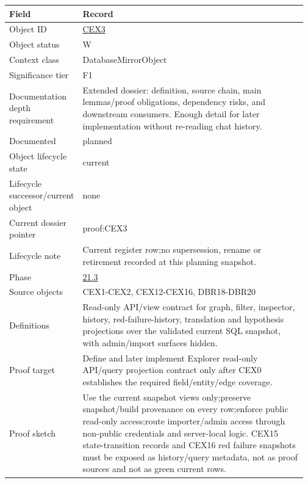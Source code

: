 \begin{longtable}{L{0.16\linewidth} L{0.81\linewidth}}
\hline
\textbf{Field} & \textbf{Record}\\
\hline
Object ID & \hyperlink{object-row-CEX3}{CEX3}\\
\hline\addlinespace[0.20em]
Object status & W\\
\hline\addlinespace[0.20em]
Context class & DatabaseMirrorObject\\
\hline\addlinespace[0.20em]
Significance tier & F1\\
\hline\addlinespace[0.20em]
Documentation depth requirement & Extended dossier: definition, source chain, main lemmas/\allowbreak{}proof obligations, dependency risks, and downstream consumers. Enough detail for later implementation without re-reading chat history.\\
\hline\addlinespace[0.20em]
Documented & planned\\
\hline\addlinespace[0.20em]
Object lifecycle state & current\\
\hline\addlinespace[0.20em]
Lifecycle successor/\allowbreak{}current object & none\\
\hline\addlinespace[0.20em]
Current dossier pointer & proof:CEX3\\
\hline\addlinespace[0.20em]
Lifecycle note & Current register row;\newline no supersession, rename or retirement recorded at this planning snapshot.\\
\hline\addlinespace[0.20em]
Phase & \hyperlink{phase-row-21-3}{21.3}\\
\hline\addlinespace[0.20em]
Source objects & CEX1-CEX2, CEX12-CEX16, DBR18-DBR20\\
\hline\addlinespace[0.20em]
Definitions & Read-only API/\allowbreak{}view contract for graph, filter, inspector, history, red-failure-history, translation and hypothesis projections over the validated current SQL snapshot, with admin/\allowbreak{}import surfaces hidden.\\
\hline\addlinespace[0.20em]
Proof target & Define and later implement Explorer read-only API/\allowbreak{}query projection contract only after CEX0 establishes the required field/\allowbreak{}entity/\allowbreak{}edge coverage.\\
\hline\addlinespace[0.20em]
Proof sketch & Use the current snapshot views only;\newline preserve snapshot/\allowbreak{}build provenance on every row;\newline enforce public read-only access;\newline route importer/\allowbreak{}admin access through non-public credentials and server-local logic. CEX15 state-transition records and CEX16 red failure snapshots must be exposed as history/\allowbreak{}query metadata, not as proof sources and not as green current rows.\\

\end{longtable}
